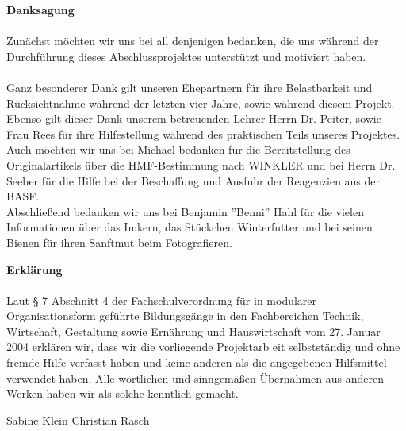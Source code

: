 \documentclass[%
11pt,                               %
liststotoc,                 %
bibtotoc,                       %
]{scrreprt}
\begin{document}







\newpage
\textbf{Danksagung}\\
\\
Zunächst möchten wir uns bei all denjenigen bedanken, die uns während der Durchführung dieses Abschlussprojektes unterstützt und motiviert haben. \\
\\
Ganz besonderer Dank gilt unseren Ehepartnern für ihre Belastbarkeit und Rücksichtnahme während der letzten vier Jahre, sowie während diesem Projekt.\\
Ebenso gilt dieser Dank unserem betreuenden Lehrer Herrn Dr. Peiter, sowie Frau Rees für ihre Hilfestellung während des praktischen Teils unseres Projektes.\\
Auch möchten wir uns bei Michael bedanken für die Bereitstellung des Originalartikels über die HMF-Bestimmung nach WINKLER und bei Herrn Dr. Seeber für die Hilfe bei der Beschaffung und Ausfuhr der Reagenzien aus der BASF.\\
Abschließend bedanken wir uns bei Benjamin ''Benni'' Hahl für die vielen Informationen über das Imkern, das Stückchen Winterfutter und bei seinen Bienen für ihren Sanftmut beim Fotografieren.


\listoffigures
\listoftables
\listofdiagrams





\newpage


\vspace*{2cm}
\textbf{Erklärung} \\
\\
Laut §  7  Abschnitt  4  der  Fachschulverordnung für  in  modularer Organisationsform geführte 
Bildungsgänge in den Fachbereichen Technik, Wirtschaft, Gestaltung sowie Ernährung und 
Hauswirtschaft  vom  27.  Januar  2004  erklären  wir,  dass  wir  die  vorliegende  Projektarb
eit 
selbstständig und ohne fremde Hilfe verfasst haben und keine anderen als die angegebenen 
Hilfsmittel  verwendet  haben.  Alle  wörtlichen  und  sinngemäßen  Übernahmen  aus  anderen 
Werken haben wir als solche kenntlich gemacht. 

\vspace*{50pt}Sabine Klein \quad Christian Rasch
\end{document}
